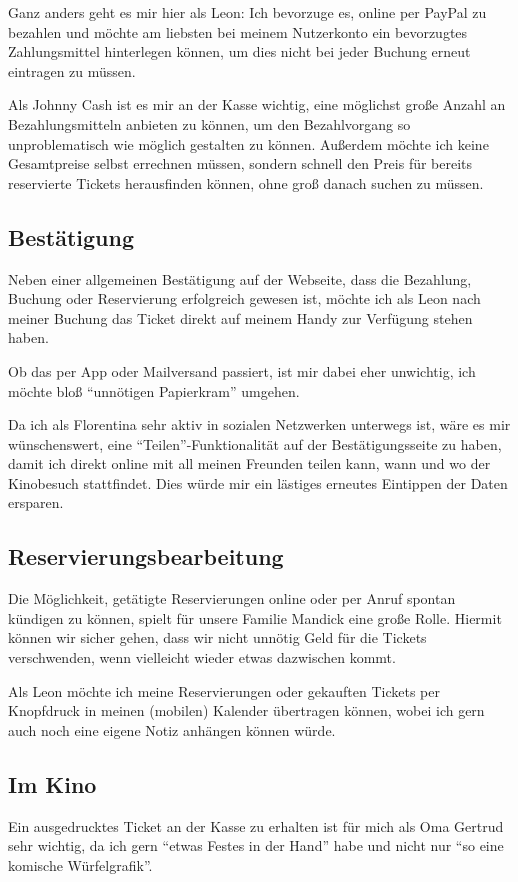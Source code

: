 Ganz anders geht es mir hier als Leon: Ich bevorzuge es, online per PayPal zu bezahlen und möchte am liebsten bei meinem Nutzerkonto ein bevorzugtes Zahlungsmittel hinterlegen können, um dies nicht bei jeder Buchung erneut eintragen zu müssen.

Als Johnny Cash ist es mir an der Kasse wichtig, eine möglichst große Anzahl an Bezahlungsmitteln anbieten zu können, um den Bezahlvorgang so unproblematisch wie möglich gestalten zu können.
Außerdem möchte ich keine Gesamtpreise selbst errechnen müssen, sondern schnell den Preis für bereits reservierte Tickets herausfinden können, ohne groß danach suchen zu müssen.

\subsection{Bestätigung}
Neben einer allgemeinen Bestätigung auf der Webseite, dass die Bezahlung, Buchung oder Reservierung erfolgreich gewesen ist, möchte ich als Leon nach meiner Buchung das Ticket direkt auf meinem Handy zur Verfügung stehen haben.

Ob das per App oder Mailversand passiert, ist mir dabei eher unwichtig, ich möchte bloß \enquote{unnötigen Papierkram} umgehen.

Da ich als Florentina sehr aktiv in sozialen Netzwerken unterwegs ist, wäre es mir wünschenswert, eine \enquote{Teilen}-Funktionalität auf der Bestätigungsseite zu haben, damit ich direkt online mit all meinen Freunden teilen kann, wann und wo der Kinobesuch stattfindet.
Dies würde mir ein lästiges erneutes Eintippen der Daten ersparen.

\subsection{Reservierungsbearbeitung}
Die Möglichkeit, getätigte Reservierungen online oder per Anruf spontan kündigen zu können, spielt für unsere Familie Mandick eine große Rolle.
Hiermit können wir sicher gehen, dass wir nicht unnötig Geld für die Tickets verschwenden, wenn vielleicht wieder etwas dazwischen kommt.

Als Leon möchte ich meine Reservierungen oder gekauften Tickets per Knopfdruck in meinen (mobilen) Kalender übertragen können, wobei ich gern auch noch eine eigene Notiz anhängen können würde.

\subsection{Im Kino}
Ein ausgedrucktes Ticket an der Kasse zu erhalten ist für mich als Oma Gertrud sehr wichtig, da ich gern \enquote{etwas Festes in der Hand} habe und nicht nur \enquote{so eine komische Würfelgrafik}.

